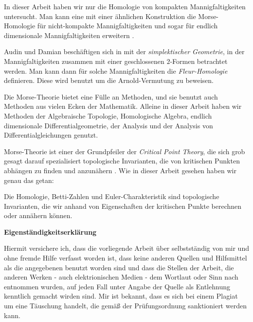 \documentclass[a4paper,11pt,twoside]{scrreport}
\begin{document}
In dieser Arbeit haben wir nur die Homologie von kompakten Mannigfaltigkeiten untersucht. Man kann
eine mit einer ähnlichen Konstruktion die Morse-Homologie für nicht-kompakte Mannigfaltigkeiten 
und sogar für endlich dimensionale Mannigfaltigkeiten erweitern \cite{mercuri}.

Audin und Damian beschäftigen sich in \cite{audin} mit der \textit{simplektischer Geometrie},
in der Mannigfaltigkeiten zusammen mit einer geschlossenen $2$-Formen betrachtet werden. Man kann 
dann für solche Mannigfaltigkeiten die \textit{Fleur-Homologie} definieren. Diese wird benutzt
um die Arnold-Vermutung zu beweisen.

Die Morse-Theorie bietet eine Fülle an Methoden, und sie benutzt auch Methoden aus vielen Ecken der 
Mathematik. Alleine in dieser Arbeit haben wir Methoden der Algebraische Topologie,
Homologische Algebra, endlich dimensionale Differentialgeometrie, der Analysis und der Analysis von 
Differentialgleichungen genutzt. 

Morse-Theorie ist einer der Grundpfeiler der \textit{Critical Point Theory}, die sich grob gesagt 
darauf spezialisiert topologische Invarianten, die von kritischen Punkten abhängen zu finden und 
anzunähern \cite{mercuri}. Wie in dieser Arbeit gesehen haben wir genau das getan:

Die Homologie, Betti-Zahlen und Euler-Charakteristik sind topologische Invarianten, die wir anhand 
von Eigenschaften der kritischen Punkte berechnen oder annähern können. 


% 

\AtNextBibliography{\small}
\printbibliography


\newpage
\begin{center}
\large{\textbf{Eigenständigkeitserklärung}}
\end{center}

\vspace{-6cm}

\normalsize Hiermit versichere ich, dass die vorliegende Arbeit über 
\textit{} selbstständig von mir und ohne fremde Hilfe verfasst 
worden ist, dass keine anderen Quellen und Hilfsmittel als die angegebenen benutzt worden sind und 
dass die Stellen der Arbeit, die anderen Werken - auch elektrionischen Medien - dem Wortlaut oder 
Sinn nach entnommen wurden, auf jeden Fall unter Angabe der Quelle als Entlehnung kenntlich gemacht 
wirden sind. Mir ist bekannt, dass es sich bei einem Plagiat um eine Täuschung handelt, die gemäß 
der Prüfungsordnung sanktioniert werden kann.
\end{document}
